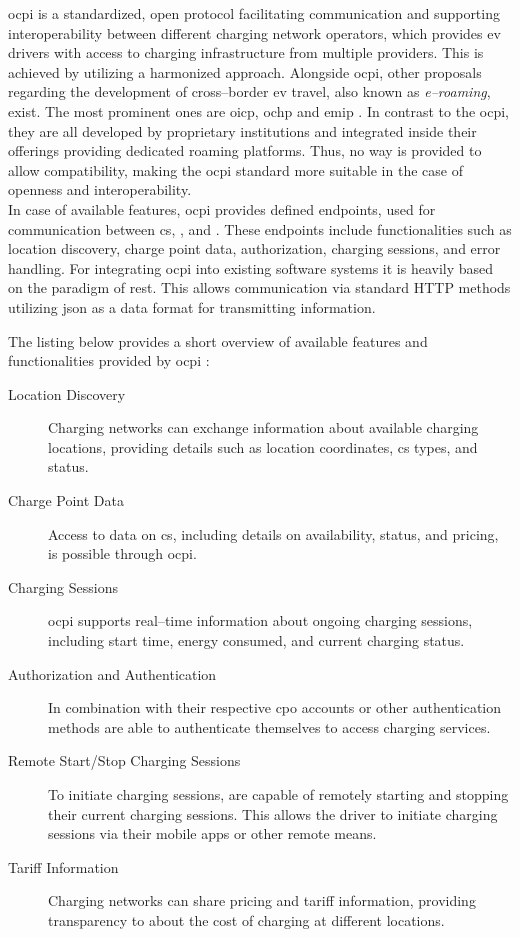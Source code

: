\acrfull{ocpi} is a standardized, open protocol facilitating communication and supporting interoperability between different charging network operators, which provides \acrshort{ev} drivers with access to charging infrastructure from multiple providers. This is achieved by utilizing a harmonized approach.
Alongside \acrshort{ocpi}, other proposals regarding the development of cross--border \acrshort{ev} travel, also known as \textit{e--roaming}, exist.
The most prominent ones are \acrfull{oicp}, \acrfull{ochp} and \acrfull{emip} \cite{ferwerda_advancing_2018}.
In contrast to the \acrshort{ocpi}, they are all developed by proprietary institutions and integrated inside their offerings providing dedicated roaming platforms.
Thus, no way is provided to allow compatibility, making the \acrshort{ocpi} standard more suitable in the case of openness and interoperability. \\
\noindent In case of available features, \acrshort{ocpi} provides defined endpoints, used for communication between \acrshort{cs}, ,  and . These endpoints include functionalities such as location discovery, charge point data, authorization, charging sessions, and error handling.
For integrating \acrshort{ocpi} into existing software systems it is heavily based on the paradigm of \acrfull{rest}. This allows communication via standard HTTP methods utilizing \acrfull{json} as a data format for transmitting information.

\noindent The listing below provides a short overview of available features and functionalities provided by \acrshort{ocpi} \cite{noauthor_open_2021}:

\begin{description}
    \item[Location Discovery] Charging networks can exchange information about available charging locations, providing details such as location coordinates, \acrshort{cs} types, and status.
    \item[Charge Point Data] Access to data on \acrshort{cs}, including details on availability, status, and pricing, is possible through \acrshort{ocpi}.
    \item[Charging Sessions] \acrshort{ocpi} supports real--time information about ongoing charging sessions, including start time, energy consumed, and current charging status.
    \item[Authorization and Authentication] In combination with their respective \acrshort{cpo} accounts or other authentication methods  are able to authenticate themselves to access charging services.
    \item[Remote Start/Stop Charging Sessions] To initiate charging sessions,  are capable of remotely starting and stopping their current charging sessions. This allows the driver to initiate charging sessions via their mobile apps or other remote means.
    \item[Tariff Information] Charging networks can share pricing and tariff information, providing transparency to  about the cost of charging at different locations.
\end{description}

